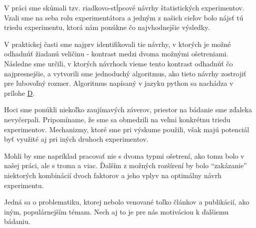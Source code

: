 V práci sme skúmali tzv. riadkovo-stĺpcové návrhy štatistických experimentov. 
Vzali sme na seba rolu experimentátora a jedným z našich cieľov bolo nájsť tú triedu experimentu, ktorá nám ponúkne čo najvhodnejšie výsledky.

V praktickej časti sme najprv identifikovali tie návrhy, v ktorých je možné odhadnúť žiadanú veličinu - kontrast medzi dvoma možnými ošetreniami. 
Následne sme určili, v ktorých návrhoch vieme tento kontrast odhadnúť čo najpresnejšie, a vytvorili sme jednoduchý algoritmus, ako tieto návrhy zostrojiť pre ľubovoľný rozmer. 
Algoritmus napísaný v jazyku python sa nachádza v prílohe \hyperref[appendix:d]{D}.

Hoci sme ponúkli niekoľko zaujímavých záverov, priestor na bádanie sme zďaleka nevyčerpali. 
Pripomíname, že sme sa obmedzili na veľmi konkrétnu triedu experimentov. Mechanizmy, ktoré sme pri výskume použili, však majú potenciál byť využité aj pri iných druhoch experimentov.

Mohli by sme napríklad pracovať nie s dvoma typmi ošetrení, ako tomu bolo v našej práci, ale s troma a viac. 
Ďalším z možných rozšírení by bolo “zakázanie” niektorých kombinácií dvoch faktorov a jeho vplyv na optimálny návrh experimentu.

Jedná sa o problematiku, ktorej nebolo venované toľko článkov a publikácií, ako iným, populárnejším témam. 
Nech aj to je pre nás motiváciou k ďalšiemu bádaniu.